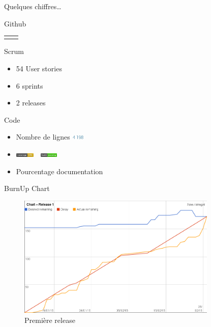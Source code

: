 \documentclass{beamer}
\begin{document}
\begin{frame}{Quelques chiffres\ldots}
\begin{block}{Github}
\begin{tabular}{cc}
\begin{minipage}{0.5\textwidth}
					\end{minipage}
				\end{tabular}
			\end{block}
			\pause
			\begin{block}{Scrum}
				\begin{itemize}
					\item 54 User stories
					\item 6 sprints
					\item 2 releases
				\end{itemize}
			\end{block}
			\pause
			\begin{block}{Code}
				\begin{itemize}
					\item Nombre de lignes \includegraphics[height=9px]{images/stats/nblines.jpg}
					\item \includegraphics[height=7px]{images/coverage.png}~~\includegraphics[height=7px]{images/build.png}
					\item Pourcentage documentation
				\end{itemize}
			\end{block}

		\end{frame}

		\begin{frame}{BurnUp Chart}
			\begin{figure}[H]
				\includegraphics[width=9.5cm]{images/release1Chart.png}
				\caption{Première release}
			\end{figure}
		\end{frame}
\end{document}
